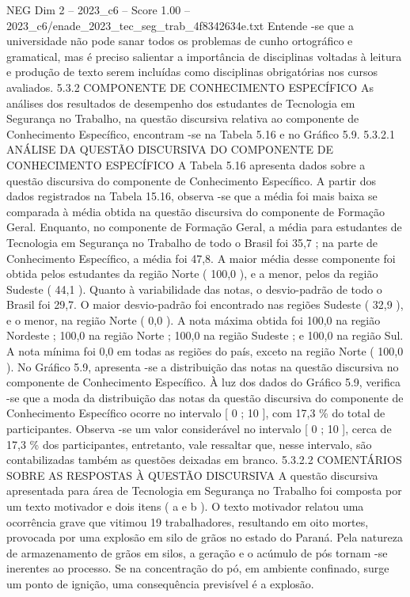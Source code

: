 \begin{textsample}{NEG Dim 2 – 2023\_c6 – Score 1.00 – 2023\_c6/enade\_2023\_tec\_seg\_trab\_4f8342634e.txt}
Entende -se que a universidade não pode sanar todos os problemas de cunho ortográfico e gramatical, mas é preciso salientar a importância de disciplinas voltadas à leitura e produção de texto serem incluídas como disciplinas obrigatórias nos cursos avaliados. 5.3.2 COMPONENTE DE CONHECIMENTO ESPECÍFICO As análises dos resultados de desempenho dos estudantes de Tecnologia em Segurança no Trabalho, na questão discursiva relativa ao componente de Conhecimento Específico, encontram -se na Tabela 5.16 e no Gráfico 5.9. 5.3.2.1 ANÁLISE DA QUESTÃO DISCURSIVA DO COMPONENTE DE CONHECIMENTO ESPECÍFICO A Tabela 5.16 apresenta dados sobre a questão discursiva do componente de Conhecimento Específico.
A partir dos dados registrados na Tabela 15.16, observa -se que a média foi mais baixa se comparada à média obtida na questão discursiva do componente de Formação Geral.
Enquanto, no componente de Formação Geral, a média para estudantes de Tecnologia em Segurança no Trabalho de todo o Brasil foi 35,7 ; na parte de Conhecimento Específico, a média foi 47,8.
A maior média desse componente foi obtida pelos estudantes da região Norte ( 100,0 ), e a menor, pelos da região Sudeste ( 44,1 ).
Quanto à variabilidade das notas, o desvio-padrão de todo o Brasil foi 29,7.
O maior desvio-padrão foi encontrado nas regiões Sudeste ( 32,9 ), e o menor, na região Norte ( 0,0 ).
A nota máxima obtida foi 100,0 na região Nordeste ; 100,0 na região Norte ; 100,0 na região Sudeste ; e 100,0 na região Sul.
A nota mínima foi 0,0 em todas as regiões do país, exceto na região Norte ( 100,0 ).
No Gráfico 5.9, apresenta -se a distribuição das notas na questão discursiva no componente de Conhecimento Específico.
À luz dos dados do Gráfico 5.9, verifica -se que a moda da distribuição das notas da questão discursiva do componente de Conhecimento Específico ocorre no intervalo [ 0 ; 10 ], com 17,3 \% do total de participantes.
Observa -se um valor considerável no intervalo [ 0 ; 10 ], cerca de 17,3 \% dos participantes, entretanto, vale ressaltar que, nesse intervalo, são contabilizadas também as questões deixadas em branco. 5.3.2.2 COMENTÁRIOS SOBRE AS RESPOSTAS À QUESTÃO DISCURSIVA A questão discursiva apresentada para área de Tecnologia em Segurança no Trabalho foi composta por um texto motivador e dois itens ( a e b ).
O texto motivador relatou uma ocorrência grave que vitimou 19 trabalhadores, resultando em oito mortes, provocada por uma explosão em silo de grãos no estado do Paraná.
Pela natureza de armazenamento de grãos em silos, a geração e o acúmulo de pós tornam -se inerentes ao processo.
Se na concentração do pó, em ambiente confinado, surge um ponto de ignição, uma consequência previsível é a explosão.

\end{textsample}
